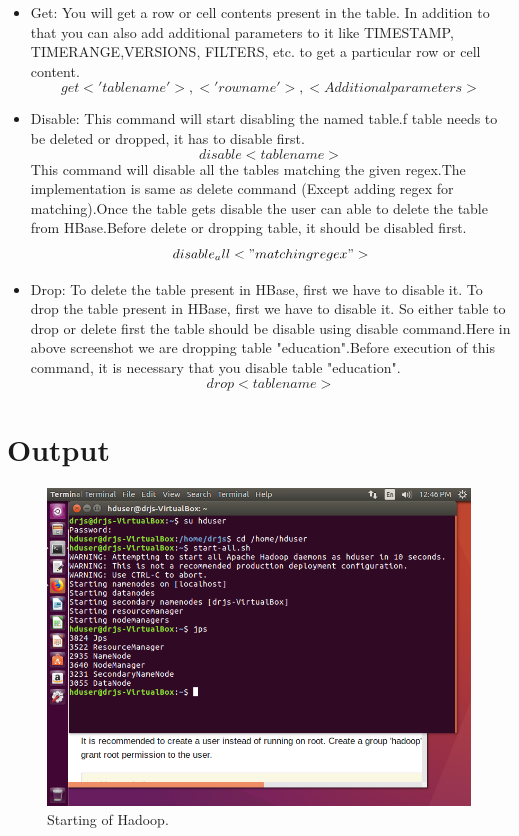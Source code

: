 \documentclass[a4paper,10pt]{article}
\begin{document}
\begin{enumerate}
\begin{itemize}
		\item Get:
		You will get a row or cell contents present in the table. In addition to that you can also add additional parameters to it like TIMESTAMP, TIMERANGE,VERSIONS, FILTERS, etc. to get a particular row or cell content. 
			\begin{equation}
				 get <'tablename'>, <'rowname'>, {< Additional parameters>}
			\end{equation}
		\item Disable:
			 This command will start disabling the named table.f table needs to be deleted or dropped, it has to disable first.
			\begin{equation}
				disable <tablename>
			\end{equation}
		This command will disable all the tables matching the given regex.The implementation is same as delete command (Except adding regex for matching).Once the table gets disable the user can able to delete the table from HBase.Before delete or dropping table, it should be disabled first.
		    \begin{equation}
				disable_all<"matching regex">
			\end{equation}
		\item Drop:
		    To delete the table present in HBase, first we have to disable it.    To drop the table present in HBase, first we have to disable it. So either table to drop or delete first the table should be disable using disable command.Here in above screenshot we are dropping table "education".Before execution of this command, it is necessary that you disable table "education".
		    \begin{equation}
				drop <table name>
			\end{equation}
	\end{itemize}
\end{enumerate}

\section{Output}

\begin{figure}[h]
	\includegraphics[scale=0.33,center]{1.png}
	\caption{Starting of Hadoop.}
	\label{fig:1}
\end{figure}
\end{document}
